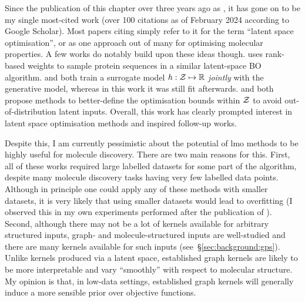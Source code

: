 Since the publication of this chapter over three years ago
as \citet{tripp2020sample},
it has gone on to be my single most-cited work
(over 100 citations as of February 2024 according to Google Scholar).
Most papers citing \citet{tripp2020sample}
simply refer to it for the term ``latent space optimisation'',
or as one approach out of many for optimising molecular properties.
A few works do notably build upon these ideas though.
\citet{stanton2022accelerating} uses rank-based weights to sample
protein sequences in a similar latent-space BO algorithm.
\citet{lee2023advancing} and \citet{maus2022local} both train
a surrogate model $h:\mathcal{Z}\mapsto\mathbb{R}$ \emph{jointly} with the generative model,
whereas in this work it was still fit afterwards.
\citet{maus2022local} and \citet{notin2021improving} both propose methods
to better-define the optimisation bounds within $\mathcal{Z}$ to avoid
out-of-distribution latent inputs.
Overall, this work has clearly prompted interest in latent space optimisation
methods and inspired follow-up works.

Despite this, I am currently pessimistic about the potential of \gls{lmo}
methods to be highly useful for molecule discovery.
There are two main reasons for this.
First, all of these works required large labelled datasets for some part of the algorithm,
despite many molecule discovery tasks having very few labelled data points.
Although in principle one could apply any of these methods with smaller datasets,
it is very likely that using smaller datasets would lead to overfitting
(I observed this in my own experiments performed after the publication of \citet{tripp2020sample}).
Second, although there may not be a lot of kernels available for arbitrary structured inputs,
graph- and molecule-structured inputs are well-studied and there are many kernels
available for such inputs (see~\S\ref{sec:background:gps}).
Unlike kernels produced via a latent space,
established graph kernels are likely to be more interpretable and 
vary ``smoothly'' with respect to molecular structure.
My opinion is that, in low-data settings, established graph kernels will
generally induce a more sensible prior over objective functions.
